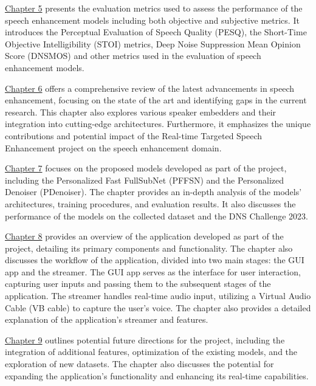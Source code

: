 \hyperref[chap:metrics]{Chapter 5} presents the evaluation metrics used to assess the performance of the speech enhancement models including both objective and subjective metrics. It introduces the Perceptual Evaluation of Speech Quality (PESQ), the Short-Time Objective Intelligibility (STOI) metrics, Deep Noise Suppression Mean Opinion Score (DNSMOS) and other metrics used in the evaluation of speech enhancement models.

\hyperref[chap:related-work]{Chapter 6} offers a comprehensive review of the latest advancements in speech enhancement, focusing on the state of the art and identifying gaps in the current research. This chapter also explores various speaker embedders and their integration into cutting-edge architectures. Furthermore, it emphasizes the unique contributions and potential impact of the Real-time Targeted Speech Enhancement project on the speech enhancement domain.

\hyperref[chap:models]{Chapter 7} focuses on the proposed models developed as part of the project, including the Personalized Fast FullSubNet (PFFSN) and the Personalized Denoiser (PDenoiser). The chapter provides an in-depth analysis of the models' architectures, training procedures, and evaluation results. It also discusses the performance of the models on the collected dataset and the DNS Challenge 2023.


\hyperref[chap:application]{Chapter 8} provides an overview of the application developed as part of the project, detailing its primary components and functionality. The chapter also discusses the workflow of the application, divided into two main stages: the GUI app and the streamer. The GUI app serves as the interface for user interaction, capturing user inputs and passing them to the subsequent stages of the application. The streamer handles real-time audio input, utilizing a Virtual Audio Cable (VB cable) to capture the user's voice. The chapter also provides a detailed explanation of the application's streamer and features.

\hyperref[chap:future-work]{Chapter 9} outlines potential future directions for the project, including the integration of additional features, optimization of the existing models, and the exploration of new datasets. The chapter also discusses the potential for expanding the application's functionality and enhancing its real-time capabilities.

\endgroup
